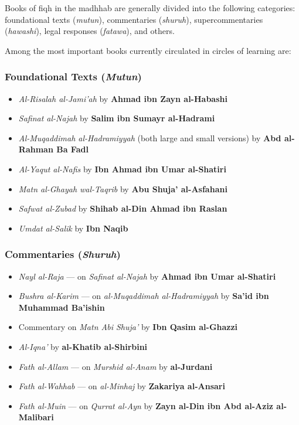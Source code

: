 \documentclass[
  a4paper,
  DIV=11,
  numbers=noendperiod]{scrartcl}
\providecommand{\tightlist}{%
  \setlength{\itemsep}{0pt}\setlength{\parskip}{0pt}}
\begin{document}
Books of fiqh in the madhhab are generally divided into the following
categories: foundational texts (\emph{mutun}), commentaries
(\emph{shuruh}), supercommentaries (\emph{hawashi}), legal responses
(\emph{fatawa}), and others.

Among the most important books currently circulated in circles of
learning are:

\subsubsection{\texorpdfstring{Foundational Texts
(\emph{Mutun})}{Foundational Texts (Mutun)}}\label{foundational-texts-mutun}

\begin{itemize}
\tightlist
\item
  \emph{Al-Risalah al-Jami'ah} by \textbf{Ahmad ibn Zayn al-Habashi}
\item
  \emph{Safinat al-Najah} by \textbf{Salim ibn Sumayr al-Hadrami}
\item
  \emph{Al-Muqaddimah al-Hadramiyyah} (both large and small versions) by
  \textbf{Abd al-Rahman Ba Fadl}
\item
  \emph{Al-Yaqut al-Nafis} by \textbf{Ibn Ahmad ibn Umar al-Shatiri}
\item
  \emph{Matn al-Ghayah wal-Taqrib} by \textbf{Abu Shuja' al-Asfahani}
\item
  \emph{Safwat al-Zubad} by \textbf{Shihab al-Din Ahmad ibn Raslan}
\item
  \emph{Umdat al-Salik} by \textbf{Ibn Naqib}
\end{itemize}

\subsubsection{\texorpdfstring{Commentaries
(\emph{Shuruh})}{Commentaries (Shuruh)}}\label{commentaries-shuruh}

\begin{itemize}
\tightlist
\item
  \emph{Nayl al-Raja} --- on \emph{Safinat al-Najah} by \textbf{Ahmad
  ibn Umar al-Shatiri}
\item
  \emph{Bushra al-Karim} --- on \emph{al-Muqaddimah al-Hadramiyyah} by
  \textbf{Sa'id ibn Muhammad Ba'ishin}
\item
  Commentary on \emph{Matn Abi Shuja'} by \textbf{Ibn Qasim al-Ghazzi}
\item
  \emph{Al-Iqna'} by \textbf{al-Khatib al-Shirbini}
\item
  \emph{Fath al-Allam} --- on \emph{Murshid al-Anam} by
  \textbf{al-Jurdani}
\item
  \emph{Fath al-Wahhab} --- on \emph{al-Minhaj} by \textbf{Zakariya
  al-Ansari}
\item
  \emph{Fath al-Muin} --- on \emph{Qurrat al-Ayn} by \textbf{Zayn al-Din
  ibn Abd al-Aziz al-Malibari}
\end{itemize}
\end{document}
